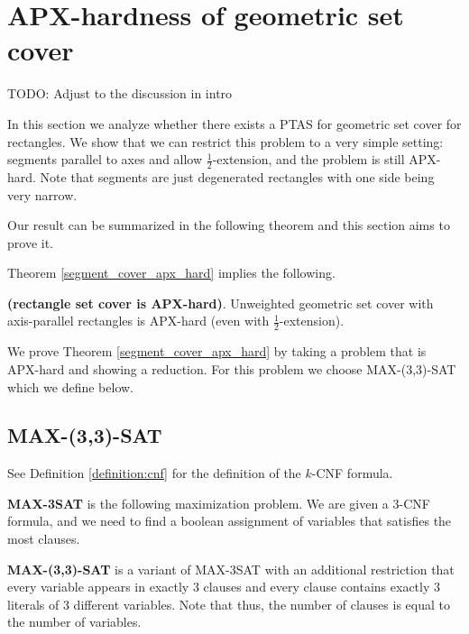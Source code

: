 \chapter{APX-hardness of geometric set cover}
\newcommand{\setCoverInstance}{(\points, \sets)}
\newcommand{\true}{\texttt{true}}
\newcommand{\false}{\texttt{false}}
\newcommand{\opt}{\mathsf{opt}}
\newcommand{\approximate}{\mathsf{approx}}

\label{chapter:segment_apx}

TODO: Adjust to the discussion in intro

In this section we analyze whether there exists 
a PTAS for geometric set cover for rectangles.
We show that we can restrict this problem
to a very simple setting:
segments parallel to axes and allow $\frac{1}{2}$-extension,
and the problem is still APX-hard.
Note that segments are just degenerated rectangles
with one side being very narrow.


Our result can be summarized in the following
theorem and this section aims to prove it.

\segmentCoverApxHard*
 
Theorem \ref{segment_cover_apx_hard} implies the following.

\begin{corollary}{
\label{rectangle_cover_apx_hard}
	\textbf{(rectangle set cover is APX-hard)}.	
	Unweighted geometric set cover
	with axis-parallel rectangles is APX-hard (even with $\frac{1}{2}$-extension).
}\end{corollary}


We prove Theorem \ref{segment_cover_apx_hard}
by taking a problem that is APX-hard
and showing a reduction.
For this problem we choose
MAX-(3,3)-SAT which we define below.

\section{MAX-(3,3)-SAT}

See Definition \ref{definition:cnf}
for the definition of the $k$-CNF formula.

\begin{defi}
\textbf{MAX-3SAT} is the following maximization problem. We are given a 3-CNF
formula, and we need to find a boolean assignment of variables
that satisfies the most clauses.
\end{defi}

\begin{defi}
\textbf{MAX-(3,3)-SAT} is a variant of MAX-3SAT with an additional
restriction that every variable appears in exactly 3 clauses
and every clause contains exactly 3 literals of 3 different variables.
Note that thus, the number of clauses is equal to the number of variables.
\end{defi}

